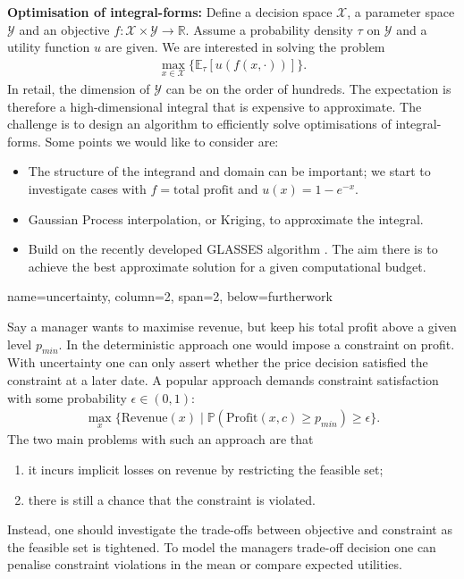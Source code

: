 \documentclass[a0paper,portrait,fontscale=0.35]{baposter}
\begin{document}
\begin{poster}
{    \textbf{Optimisation of integral-forms:} Define a decision space $\mathcal X$, a parameter space
    $\mathcal Y$ and an objective $f:\mathcal X\times\mathcal Y\to
    \mathbb R$.
    Assume a probability density $\tau$ on $\mathcal Y$ and a utility
    function $u$ are given. We are interested in solving the problem
    \begin{align}
      \max_{x\in\mathcal X}\{\mathbb E_\tau [u(f(x,\cdot))]\}.
    \end{align}
    In retail, the dimension of $\mathcal Y$ can be on the order of
    hundreds. The expectation is therefore a high-dimensional integral
    that is expensive to approximate. The challenge is to design
    an algorithm to efficiently solve optimisations of
    integral-forms. Some points we would like to consider are:
    \begin{itemize}
    \item The structure of the integrand and domain can be important;
      we start to investigate cases with $f=\mbox{total profit}$ and
      $u(x)=1-e^{-x}$.
    \item Gaussian Process interpolation, or Kriging, to approximate
      the integral.
    \item Build on the recently
      developed GLASSES algorithm \citep{gonzalez2015glasses}.
      The aim there is to achieve the best approximate
      solution for a given computational budget.
    \end{itemize}

  }

  {name=uncertainty, column=2, span=2, below=furtherwork}
  {
    Say a manager wants to maximise revenue, but keep his total profit
    above a given level $p_{min}$. In the deterministic approach one would
    impose a constraint on profit. With uncertainty one can only
    assert whether the price decision satisfied the constraint at a
    later date.
    A popular approach demands constraint satisfaction with
    some probability $\epsilon\in(0,1)$:
    \begin{align}
      \max_{x}\{\mbox{Revenue}(x)\mid
      \mathbb P(\mbox{Profit}(x,c)\geq p_{min})\geq \epsilon\}.
    \end{align}
    The two main problems with such an approach are that
    \begin{enumerate}
    \item it incurs implicit losses on revenue by restricting the
      feasible set;
    \item there is still a chance that the constraint is violated.
    \end{enumerate}
    Instead, one should investigate the trade-offs between objective and
    constraint as the feasible set is tightened.
    To model the managers trade-off decision one can penalise constraint
    violations in the mean or compare expected utilities.

}
\end{poster}
\end{document}
